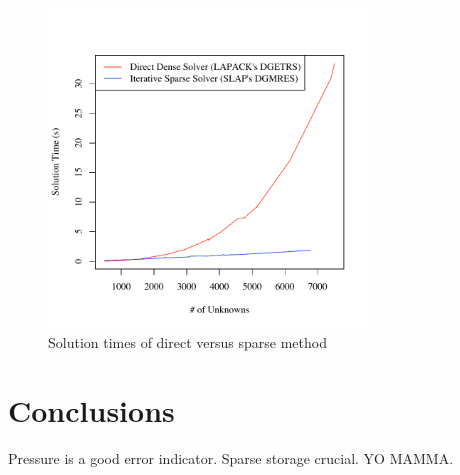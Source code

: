 \documentclass[wrr]{agutex}  %
\begin{document}
\begin{article}
\begin{figure}
\noindent\includegraphics[width=20pc]{../plots/solution_times.pdf}
\caption{Solution times of direct versus sparse method}\label{fig:times}
\end{figure}




\section{Conclusions}

Pressure is a good error indicator.  Sparse storage crucial.  YO MAMMA.



\end{article}
\end{document}
